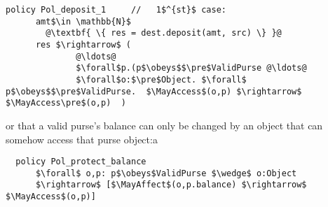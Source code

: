 \begin{lstlisting}[escapechar=@]
  policy Pol_deposit_1     //   1$^{st}$ case:
      amt$\in \mathbb{N}$
        @\textbf{ \{ res = dest.deposit(amt, src) \} }@
      res $\rightarrow$ (
              @\ldots@
              $\forall$p.(p$\obeys$$\pre$ValidPurse @\ldots@
              $\forall$o:$\pre$Object. $\forall$ p$\obeys$$\pre$ValidPurse.  $\MayAccess$(o,p) $\rightarrow$ $\MayAccess\pre$(o,p)  )
\end{lstlisting}

\noindent or that a valid purse's balance can only be changed by an
object that can somehow access that purse object:a

\begin{lstlisting}
  policy Pol_protect_balance
      $\forall$ o,p: p$\obeys$ValidPurse $\wedge$ o:Object
      $\rightarrow$ [$\MayAffect$(o,p.balance) $\rightarrow$ $\MayAccess$(o,p)]
\end{lstlisting}
